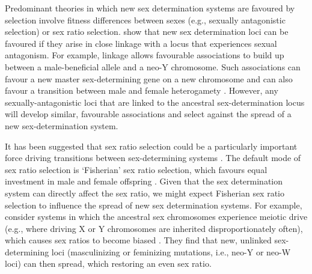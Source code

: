 \documentclass[12pt]{article}
\begin{document}



Predominant theories in which new sex determination systems are favoured by selection involve fitness differences between sexes (e.g., sexually antagonistic selection) or sex ratio selection.
\citet{vanDoorn:2007eu,vanDoorn:2010hu} show that new sex determination loci can be favoured if they arise in close linkage with a locus that experiences sexual antagonism. 
For example, linkage allows favourable associations to build up between a male-beneficial allele and a neo-Y chromosome. 
Such associations can favour a new master sex-determining gene on a new chromosome \citep{vanDoorn:2007eu} and can also favour a transition between male and female heterogamety \citep[e.g., a ZW to XY transition,][]{vanDoorn:2010hu}.
However, any sexually-antagonistic loci that are linked to the ancestral sex-determination locus will develop similar, favourable associations and select against the spread of a new sex-determination system. 

It has been suggested that sex ratio selection could be a particularly important force driving transitions between sex-determining systems \citep[Chapter 7]{Beukeboom:2014vb}. 
The default mode of sex ratio selection is `Fisherian' sex ratio selection, which favours equal investment in male and female offspring \citep[i.e., a 1:1 zygotic sex ratio when assuming that males and females are equally costly to produce,][]{Fisher:1930wy,Charnov:1982wg}. 
Given that the sex determination system can directly affect the sex ratio, we might expect Fisherian sex ratio selection to influence the spread of new sex determination systems. 
For example, \citet{Kozielska:2010vm} consider systems in which the ancestral sex chromosomes experience meiotic drive (e.g., where driving X or Y chromosomes are inherited disproportionately often), which causes sex ratios to become biased \citep{Hamilton:1967ts}. 
They find that new, unlinked sex-determining loci (masculinizing or feminizing mutations, i.e., neo-Y or neo-W loci) can then spread, which restoring an even sex ratio. 
\end{document}
